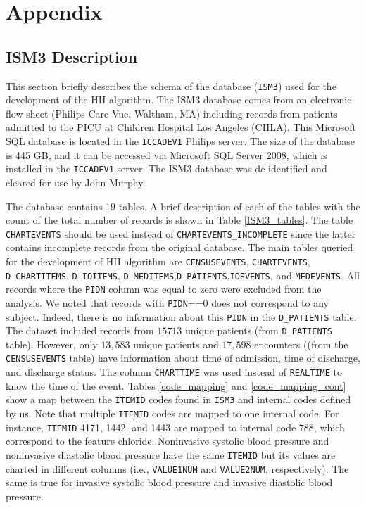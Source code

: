 \documentclass[
   technote
]{phildoc}
\newcommand{\ie}{i.e.,}
\newcommand{\tab}{Table}
\begin{document}



%
%
\cleardoublepage
\appendix
\chapter{Appendix}

\section{ISM3 Description}
This section briefly describes the schema of the database (\texttt{ISM3}) used for the development of the HII algorithm. The ISM3 database comes from an electronic flow sheet (Philips Care-Vue, Waltham, MA) including records from patients admitted to the PICU at Children Hospital Los Angeles (CHLA). This Microsoft SQL database is located in the \texttt{ICCADEV1} Philips server. The size of the database is 445 GB, and it can be accessed via Microsoft SQL Server 2008, which is installed in the \texttt{ICCADEV1} server. The ISM3 database was de-identified and cleared for use by John Murphy.

The database contains $19$ tables. A brief description of each of the tables with the count of the total number of records is shown in \tab{} \ref{ISM3_tables}. The table \verb|CHARTEVENTS| should be used instead of  \verb|CHARTEVENTS_INCOMPLETE| since the latter contains incomplete records from the original database. The main tables queried for the development of HII algorithm are \verb|CENSUSEVENTS|, \verb|CHARTEVENTS|, \verb|D_CHARTITEMS|, \verb|D_IOITEMS|, \verb|D_MEDITEMS|,\verb|D_PATIENTS|,\verb|IOEVENTS|, and \verb|MEDEVENTS|. All records where the \verb|PIDN| column was equal to zero were excluded from the analysis. We noted that records with \verb|PIDN|==0 does not correspond to any subject. Indeed, there is no information about this \verb|PIDN| in the \verb|D_PATIENTS| table. The dataset included records from $15713$ unique patients (from \verb|D_PATIENTS| table). However, only $13,583$ unique patients and $17,598$ encounters ((from the \verb|CENSUSEVENTS| table) have information about time of admission, time of discharge, and discharge status. The column \verb|CHARTTIME| was used instead of \verb|REALTIME| to know the time of the event. Tables \ref{code_mapping} and \ref{code_mapping_cont} show a map between the \verb|ITEMID| codes found in \verb|ISM3| and internal codes defined by us. Note that multiple \verb|ITEMID| codes are mapped to one internal code. For instance, \verb|ITEMID| 4171, 1442, and 1443 are mapped to internal code 788, which correspond to the feature chloride.  Noninvasive systolic blood pressure and noninvasive diastolic blood pressure have the same \verb|ITEMID| but its values are charted in different columns (\ie{} \verb|VALUE1NUM| and \verb|VALUE2NUM|, respectively). The same is true for invasive systolic blood pressure and invasive diastolic blood pressure. 
\end{document}
